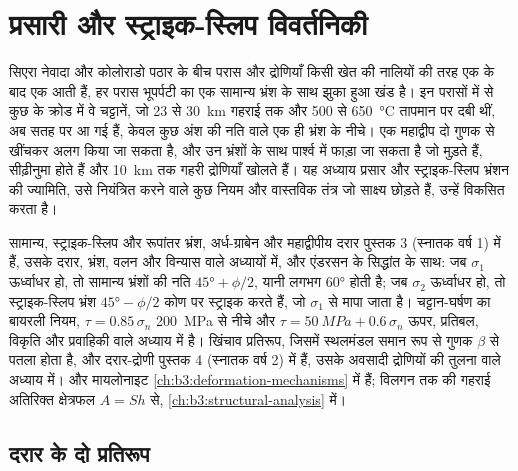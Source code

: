 \chapter{प्रसारी और स्ट्राइक-स्लिप विवर्तनिकी}\label{ch:b3:extension-strike-slip}

सिएरा नेवादा और कोलोराडो पठार के बीच परास और द्रोणियाँ
किसी खेत की नालियों की तरह एक के बाद एक आती हैं, हर परास भूपर्पटी का
एक सामान्य भ्रंश के साथ झुका हुआ खंड है। इन परासों में से कुछ के क्रोड में वे चट्टानें,
जो 23 से \qty{30}{km} गहराई तक और 500 से \qty{650}{\celsius} तापमान पर दबी थीं, अब
सतह पर आ गई हैं, केवल कुछ अंश की नति वाले एक ही भ्रंश के नीचे। एक महाद्वीप
दो गुणक से खींचकर अलग किया जा सकता है, और उन भ्रंशों के साथ पार्श्व में फाड़ा जा सकता है
जो मुड़ते हैं, सीढ़ीनुमा होते हैं और \qty{10}{km} तक गहरी द्रोणियाँ खोलते हैं। यह अध्याय
प्रसार और स्ट्राइक-स्लिप भ्रंशन की ज्यामिति, उसे नियंत्रित करने वाले कुछ नियम
और वास्तविक तंत्र जो साक्ष्य छोड़ते हैं, उन्हें विकसित करता है।

\begin{recall}
सामान्य, स्ट्राइक-स्लिप और रूपांतर भ्रंश, अर्ध-ग्राबेन और महाद्वीपीय
दरार पुस्तक 3 (स्नातक वर्ष 1) में हैं, उसके दरार, भ्रंश, वलन और विन्यास वाले अध्यायों में,
और एंडरसन के सिद्धांत के साथ: जब $\sigma_1$ ऊर्ध्वाधर हो, तो सामान्य भ्रंशों की
नति $\ang{45} + \phi/2$, यानी लगभग \ang{60} होती है; जब $\sigma_2$ ऊर्ध्वाधर हो, तो स्ट्राइक-स्लिप
भ्रंश $\ang{45} - \phi/2$ कोण पर स्ट्राइक करते हैं, जो $\sigma_1$ से मापा जाता है। चट्टान-घर्षण का
बायरली नियम, $\tau = 0.85\,\sigma_n$ \qty{200}{MPa} से नीचे और $\tau =
\qty{50}{MPa} + 0.6\,\sigma_n$ ऊपर, प्रतिबल, विकृति
और प्रवाहिकी वाले अध्याय में है। खिंचाव प्रतिरूप, जिसमें स्थलमंडल समान रूप से
गुणक $\beta$ से पतला होता है, और दरार-द्रोणी पुस्तक 4 (स्नातक वर्ष 2) में हैं, उसके
अवसादी द्रोणियों की तुलना वाले अध्याय में।  और मायलोनाइट
\cref{ch:b3:deformation-mechanisms} में हैं; विलगन तक की गहराई अतिरिक्त क्षेत्रफल
$A = Sh$ से, \cref{ch:b3:structural-analysis} में।
\end{recall}

\section{दरार के दो प्रतिरूप}\label{sec:b3:extension-strike-slip:models}

